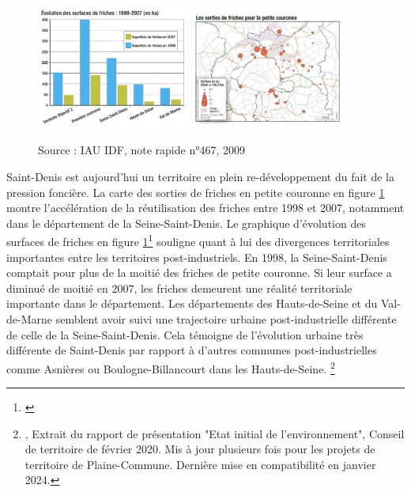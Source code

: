 \documentclass[a4paper,twoside,12pt]{book}
\begin{document}
\begin{figure}[!h]
\centering 
\includegraphics[width=0.45\textwidth]{img/chapitre1/IAU_NR_467_Graph_Evo_Nb_Friches.png}
\includegraphics[width=0.45\textwidth]{img/chapitre1/IAU_NR_467_Carte_evolutionfrichesPC.png}
\caption{Source : IAU IDF, note rapide n°467, 2009}
\label{fig:IAU_Noterapide_friches_2009}
\end{figure}

Saint-Denis est aujourd'hui un territoire en plein re-développement du fait de la pression foncière. La carte des sorties de friches en petite couronne en figure \ref{fig:IAU_Noterapide_friches_2009} montre l'accélération de la réutilisation des friches entre 1998 et 2007, notamment dans le département de la Seine-Saint-Denis. Le graphique d'évolution des surfaces de friches en figure \ref{fig:IAU_Noterapide_friches_2009}\footnote{\cite{husson_jean-louis_moins_2009}} souligne quant à lui des divergences territoriales importantes entre les territoires post-industriels. En 1998, la Seine-Saint-Denis comptait pour plus de la moitié des friches de petite couronne. Si leur surface a diminué de moitié en 2007, les friches demeurent une réalité territoriale importante dans le département. Les départements des Hauts-de-Seine et du Val-de-Marne semblent avoir suivi une trajectoire urbaine post-industrielle différente de celle de la Seine-Saint-Denis. Cela témoigne de l'évolution urbaine très différente de Saint-Denis par rapport à d'autres communes post-industrielles comme Asnières ou Boulogne-Billancourt dans les Hauts-de-Seine. \footnote{\cite{ept_plaine_commune_plui_2020}, Extrait du rapport de présentation "Etat initial de l'environnement", Conseil de territoire de février 2020. Mis à jour plusieurs fois pour les projets de territoire de Plaine-Commune. Dernière mise en compatibilité en janvier 2024.} 
\end{document}
